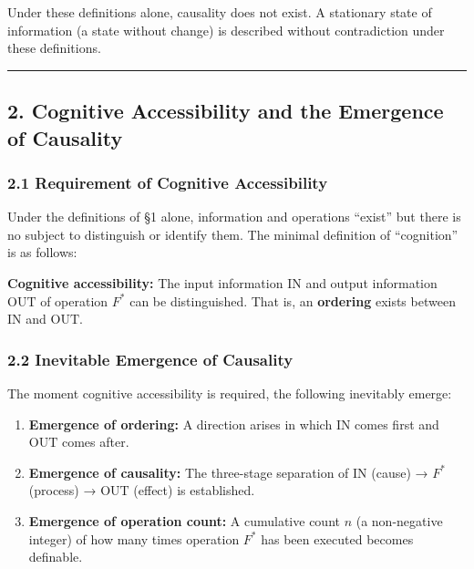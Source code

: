 \documentclass[a4paper,11pt]{article}
\providecommand{\tightlist}{\setlength{\itemsep}{0pt}\setlength{\parskip}{0pt}}
\begin{document}
Under these definitions alone, causality does not exist. A stationary
state of information (a state without change) is described without
contradiction under these definitions.

\begin{center}\rule{0.5\linewidth}{0.5pt}\end{center}

\subsection{2. Cognitive Accessibility and the Emergence of
Causality}\label{cognitive-accessibility-and-the-emergence-of-causality}

\subsubsection{2.1 Requirement of Cognitive
Accessibility}\label{requirement-of-cognitive-accessibility}

Under the definitions of §1 alone, information and operations ``exist''
but there is no subject to distinguish or identify them. The minimal
definition of ``cognition'' is as follows:

\textbf{Cognitive accessibility:} The input information \(\mathrm{IN}\)
and output information \(\mathrm{OUT}\) of operation \(F^*\) can be
distinguished. That is, an \textbf{ordering} exists between
\(\mathrm{IN}\) and \(\mathrm{OUT}\).

\subsubsection{2.2 Inevitable Emergence of
Causality}\label{inevitable-emergence-of-causality}

The moment cognitive accessibility is required, the following inevitably
emerge:

\begin{enumerate}
\def\labelenumi{\arabic{enumi}.}
\tightlist
\item
  \textbf{Emergence of ordering:} A direction arises in which
  \(\mathrm{IN}\) comes first and \(\mathrm{OUT}\) comes after.
\item
  \textbf{Emergence of causality:} The three-stage separation of
  \(\mathrm{IN}\) (cause) → \(F^*\) (process) → \(\mathrm{OUT}\)
  (effect) is established.
\item
  \textbf{Emergence of operation count:} A cumulative count \(n\) (a
  non-negative integer) of how many times operation \(F^*\) has been
  executed becomes definable.
\end{enumerate}
\end{document}
